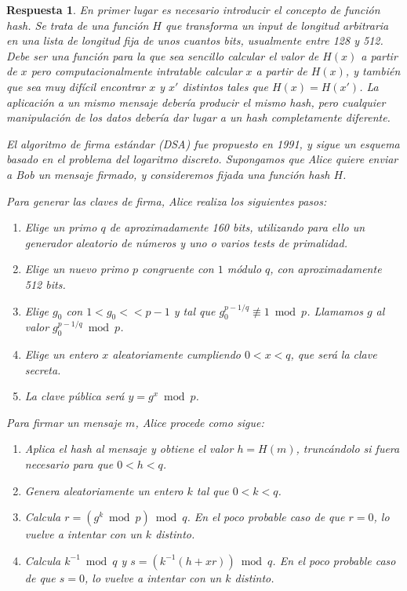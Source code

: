 \documentclass[
  a4paper,
  spanish,
  12pt,
]{scrartcl}
\theoremstyle{ejercicio-style}
\theoremstyle{remark-style}
\newtheorem*{sol}{Respuesta}
\theoremstyle{teorema-style}
\begin{document}
\begin{sol}
  En primer lugar es necesario introducir el concepto de \textit{función hash}. Se trata de una función $H$ que transforma un \textit{input} de longitud arbitraria en una lista de longitud fija de unos cuantos bits, usualmente entre 128 y 512. Debe ser una función para la que sea sencillo calcular el valor de $H(x)$ a partir de $x$ pero computacionalmente intratable calcular $x$ a partir de $H(x)$, y también que sea muy difícil encontrar $x$ y $x'$ distintos tales que $H(x)=H(x')$. La aplicación a un mismo mensaje debería producir el mismo \textit{hash}, pero cualquier manipulación de los datos debería dar lugar a un \textit{hash} completamente diferente.

  El algoritmo de firma estándar (DSA) fue propuesto en 1991, y sigue un esquema basado en el problema del logaritmo discreto. Supongamos que Alice quiere enviar a Bob un mensaje firmado, y consideremos fijada una función hash $H$.

  Para generar las claves de firma, Alice realiza los siguientes pasos:

  \begin{enumerate}
    \item Elige un primo $q$ de aproximadamente 160 bits, utilizando para ello un generador aleatorio de números y uno o varios tests de primalidad.
    \item Elige un nuevo primo $p$ congruente con $1$ módulo $q$, con aproximadamente 512 bits.
    \item Elige $g_0$ con $1 < g_0 << p-1$ y tal que $g_0 ^{p-1/q} \not\equiv 1 \bmod p$. Llamamos $g$ al valor  $g_0 ^{p-1/q} \bmod p$. 
    \item Elige un entero $x$ aleatoriamente cumpliendo $0 < x < q$, que será la clave secreta.
    \item La clave pública será $y = g^x \bmod p$.
  \end{enumerate}

  Para firmar un mensaje $m$, Alice procede como sigue:
  \begin{enumerate}
    \item Aplica el hash al mensaje y obtiene el valor $h = H(m)$, truncándolo si fuera necesario para que $0 < h < q$.
    \item Genera aleatoriamente un entero $k$ tal que $0 < k < q$.
    \item Calcula $r=(g^k \bmod p) \bmod q$. En el poco probable caso de que $r=0$, lo vuelve a intentar con un $k$ distinto.
    \item Calcula $k^{-1} \bmod q$ y $s = (k^{-1}(h + xr)) \bmod q$. En el poco probable caso de que $s=0$, lo vuelve a intentar con un $k$ distinto.
  \end{enumerate}


\end{sol}
\end{document}
